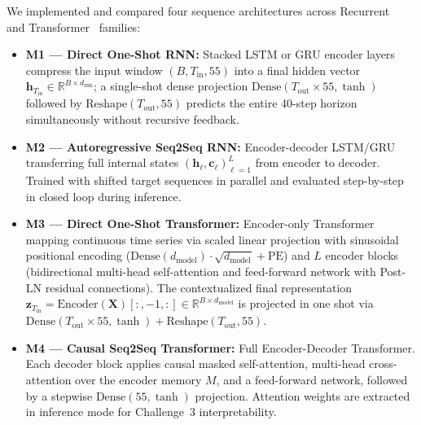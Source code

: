 \documentclass[10pt,a4paper]{article}
\begin{document}
We implemented and compared four sequence architectures across Recurrent~\cite{sutskever2014} and Transformer~\cite{vaswani2017} families:
\begin{itemize}[leftmargin=*, itemsep=1.5pt, topsep=2pt]
    \item \textbf{M1 --- Direct One-Shot RNN:} Stacked LSTM or GRU encoder layers compress the input window $(B, T_{\text{in}}, 55)$ into a final hidden vector $\mathbf{h}_{T_{\text{in}}} \in \mathbb{R}^{B \times d_{\text{rnn}}}$; a single-shot dense projection $\text{Dense}(T_{\text{out}} \times 55, \tanh)$ followed by $\text{Reshape}(T_{\text{out}}, 55)$ predicts the entire 40-step horizon simultaneously without recursive feedback.
    \item \textbf{M2 --- Autoregressive Seq2Seq RNN:} Encoder-decoder LSTM/GRU transferring full internal states $(\mathbf{h}_\ell, \mathbf{c}_\ell)_{\ell=1}^L$ from encoder to decoder. Trained with shifted target sequences in parallel and evaluated step-by-step in closed loop during inference.
    \item \textbf{M3 --- Direct One-Shot Transformer:} Encoder-only Transformer mapping continuous time series via scaled linear projection with sinusoidal positional encoding ($\text{Dense}(d_{\text{model}}) \cdot \sqrt{d_{\text{model}}} + \text{PE}$) and $L$ encoder blocks (bidirectional multi-head self-attention and feed-forward network with Post-LN residual connections). The contextualized final representation $\mathbf{z}_{T_{\text{in}}} = \text{Encoder}(\mathbf{X})[:, -1, :] \in \mathbb{R}^{B \times d_{\text{model}}}$ is projected in one shot via $\text{Dense}(T_{\text{out}} \times 55, \tanh) + \text{Reshape}(T_{\text{out}}, 55)$.
    \item \textbf{M4 --- Causal Seq2Seq Transformer:} Full Encoder-Decoder Transformer. Each decoder block applies causal masked self-attention, multi-head cross-attention over the encoder memory $M$, and a feed-forward network, followed by a stepwise $\text{Dense}(55, \tanh)$ projection. Attention weights are extracted in inference mode for Challenge~3 interpretability.
\end{itemize}
\end{document}
